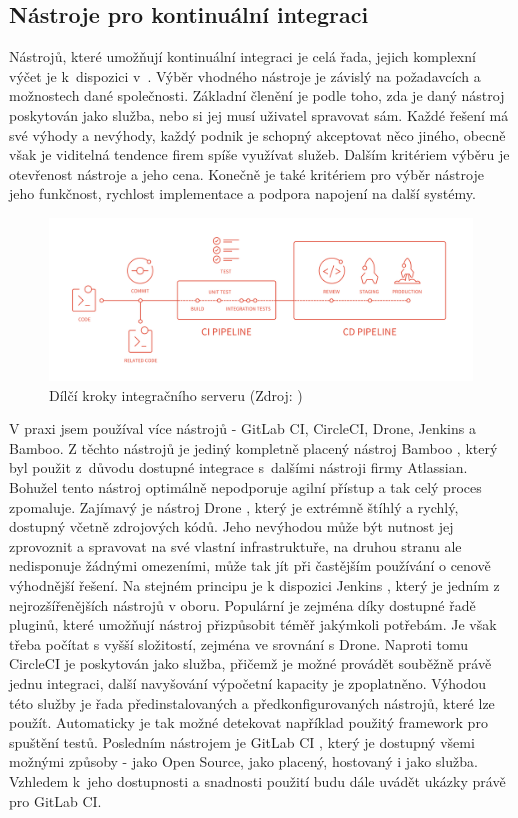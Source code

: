 \documentclass[FM,DP]{tulthesis}
\begin{document}
\subsection{Nástroje pro kontinuální integraci}

Nástrojů, které umožňují kontinuální integraci je celá řada, jejich komplexní výčet je k~dispozici 
v~\cite[strana~139]{microservices}. Výběr vhodného nástroje je závislý na požadavcích a možnostech dané
společnosti. Základní členění je podle toho, zda je daný nástroj poskytován jako služba, nebo si jej
musí uživatel spravovat sám. Každé řešení má své výhody a nevýhody, každý podnik je schopný akceptovat
něco jiného, obecně však je viditelná tendence firem spíše využívat služeb. Dalším kritériem
výběru je otevřenost nástroje a jeho cena. Konečně je také kritériem pro výběr nástroje jeho
funkčnost, rychlost implementace a podpora napojení na další systémy.

\begin{figure}[h]
\center
\includegraphics[width=\textwidth]{ci-steps.png}
\caption{Dílčí kroky integračního serveru (Zdroj: \cite{gitlab})}
\label{ci-steps}
\end{figure}

V praxi jsem používal více nástrojů - GitLab CI, CircleCI, Drone, Jenkins a Bamboo. Z těchto nástrojů je
jediný kompletně placený nástroj Bamboo \cite{bamboo}, který byl použit z~důvodu dostupné integrace s~dalšími 
nástroji firmy Atlassian. Bohužel tento nástroj optimálně nepodporuje agilní přístup a tak celý proces 
zpomaluje. Zajímavý je nástroj Drone \cite{drone}, který je extrémně štíhlý a rychlý, dostupný včetně zdrojových kódů. 
Jeho nevýhodou může být nutnost jej zprovoznit a spravovat na své vlastní infrastruktuře, na druhou stranu ale 
nedisponuje žádnými omezeními, může tak jít při častějším používání o cenově výhodnější řešení. Na stejném
principu je k dispozici Jenkins \cite{jenkins}, který je jedním z nejrozšířenějších nástrojů v oboru. Populární
je zejména díky dostupné řadě pluginů, které umožňují nástroj přizpůsobit téměř jakýmkoli potřebám. Je však třeba
počítat s vyšší složitostí, zejména ve srovnání s Drone. Naproti tomu CircleCI \cite{circle} je poskytován jako služba,
přičemž je možné provádět souběžně právě jednu integraci, další navyšování výpočetní kapacity je zpoplatněno. 
Výhodou této služby je řada předinstalovaných a předkonfigurovaných nástrojů, které lze použít. Automaticky
je tak možné detekovat například použitý framework pro spuštění testů. Posledním nástrojem je GitLab CI \cite{gitlab},
který je dostupný všemi možnými způsoby - jako Open Source, jako placený, hostovaný i jako služba. Vzhledem k~jeho
dostupnosti a snadnosti použití budu dále uvádět ukázky právě pro GitLab CI.
\end{document}

